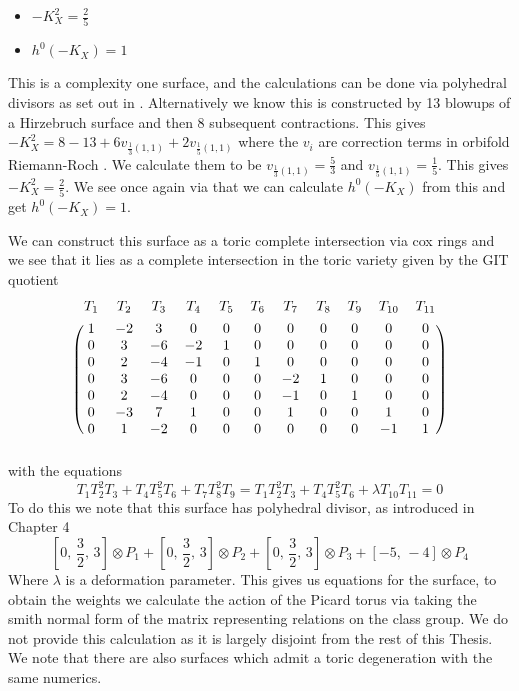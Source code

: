 \documentclass[12pt,a4paper]{book}      %
\theoremstyle{definition}
\begin{document}
\begin{itemize}
\item $-K_X^2 = \frac{2}{5}$
\item $h^0(-K_X) = 1$
\end{itemize}
This is a complexity one surface, and the calculations can be done via polyhedral divisors as set out in \cite{Polarised polyhedral divisors}. 
Alternatively we know this is constructed by 13 blowups of a Hirzebruch surface and then 8 subsequent contractions. This gives $-K_X^2 = 8 - 13 + 6 v_{\frac{1}{3}(1,1)} + 2 v_{\frac{1}{5}(1,1)}$ where the $v_i$ are correction terms in orbifold Riemann-Roch \cite{Young}. We calculate them to be $v_{\frac{1}{3}(1,1)}  = \frac{5}{3}$ and $v_{\frac{1}{5}(1,1)}  = \frac{1}{5}$. This gives $-K_X^2 = \frac{2}{5}$. We see once again via \cite{Young} that we can calculate $h^0(-K_X)$ from this and get $h^0(-K_X) = 1$.


We can construct this surface as a toric complete intersection via cox rings \cite{HausenCox} and we see that it lies as a complete intersection in the toric variety given by the GIT quotient
\[
\begin{blockarray}{cc cc cc cc cc c}
	T_1 & T_2 & T_3 & T_4 & T_5 & T_6 & T_7 & T_8 & T_9 & T_{10} & T_{11} \\[4pt]
      \begin{block}{(cc cc cc cc cc c)}
	1&-2&3&0&0&0&0&0&0&0&0 \\ 
	0&3&-6&-2&1&0&0&0&0&0&0 \\
	0&2&-4&-1&0&1&0&0&0&0&0 \\
	0&3&-6&0&0&0&-2&1&0&0&0 \\ 
	0&2&-4&0&0&0&-1&0&1&0&0 \\
	0&-3&7&1&0&0&1&0&0&1&0 \\
	0&1&-2&0&0&0&0&0&0&-1&1 \\
      \end{block}
\end{blockarray}
\]
with the equations 
\[
T_1 T_2^2 T_3 + T_4 T_5^2 T_6 + T_7 T_8^2 T_9 = 
T_1 T_2^2 T_3 + T_4 T_5^2 T_6  + \lambda T_{10} T_{11} = 0
\]
To do this we note that this surface has polyhedral divisor, as introduced in Chapter 4
\[ 
\left[ 0, \, \frac{3}{2}, \, 3 \right] \otimes P_1 + \left[ 0, \, \frac{3}{2}, \, 3 \right] \otimes P_2 + \left[ 0, \, \frac{3}{2}, \, 3 \right] \otimes P_3 + \left[ -5, \, -4 \right] \otimes P_4
\]
Where $\lambda$ is a deformation parameter. This gives us equations for the surface, to obtain the weights we calculate the action of the Picard torus via taking the smith normal form of the matrix representing relations on the class group. We do not provide this calculation as it is largely disjoint from the rest of this Thesis. We note that there are also surfaces which admit a toric degeneration with the same numerics.
\end{document}
